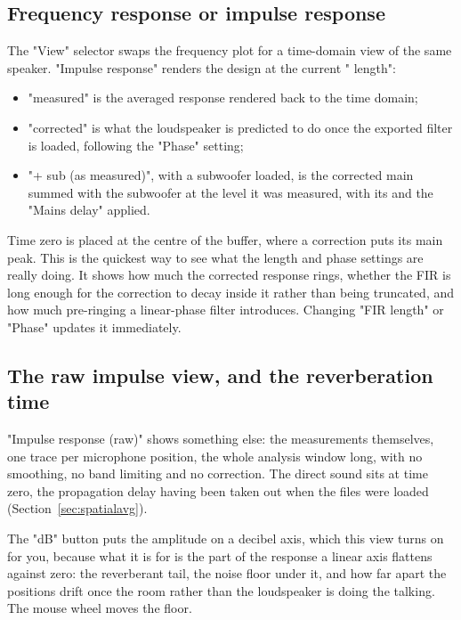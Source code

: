 \subsection{Frequency response or impulse response}\label{sec:irview}
The "View" selector swaps the frequency plot for a time-domain view of the same speaker. "Impulse response" renders the design at the current " length":

\begin{itemize}[nosep]
  \item "measured" is the averaged response rendered back to the time domain;
  \item "corrected" is what the loudspeaker is predicted to do once the exported filter is loaded, following the "Phase" setting;
  \item "+ sub (as measured)", with a subwoofer loaded, is the corrected main summed with the subwoofer at the level it was measured, with its  and the "Mains delay" applied.
\end{itemize}

\noindent Time zero is placed at the centre of the buffer, where a  correction puts its main peak. This is the quickest way to see what the length and phase settings are really doing. It shows how much the corrected response rings, whether the FIR is long enough for the correction to decay inside it rather than being truncated, and how much pre-ringing a linear-phase filter introduces. Changing "FIR length" or "Phase" updates it immediately.

\subsection{The raw impulse view, and the reverberation time}\label{sec:rawir}
"Impulse response (raw)" shows something else: the measurements themselves, one trace per microphone position, the whole analysis window long, with no smoothing, no band limiting and no correction. The direct sound sits at time zero, the propagation delay having been taken out when the files were loaded (Section~\ref{sec:spatialavg}).

The "dB" button puts the amplitude on a decibel axis, which this view turns on for you, because what it is for is the part of the response a linear axis flattens against zero: the reverberant tail, the noise floor under it, and how far apart the positions drift once the room rather than the loudspeaker is doing the talking. The mouse wheel moves the floor.

